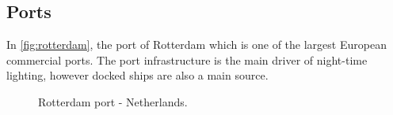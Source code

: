\subsection{Ports}
 In \autoref{fig:rotterdam}, the port of Rotterdam which is one of the largest European commercial ports. The port infrastructure is the main driver of night-time lighting, however docked ships are also a main source.
\begin{figure}[h!]
    \hspace*{-2.8cm}
    \centering
    \caption{Rotterdam port - Netherlands.}%
    \label{fig:rotterdam}
\end{figure}
